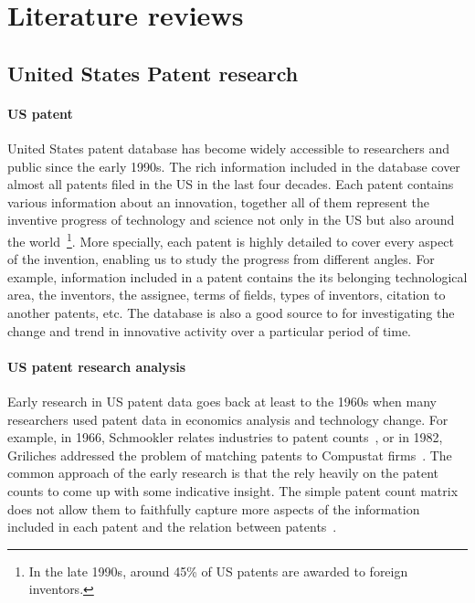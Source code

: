 \section{Literature reviews}

\subsection{United States Patent research}

\paragraph{US patent} United States patent database has become widely accessible to researchers and public since the early 1990s. The rich information included in the database cover almost all patents filed in the US in the last four decades. Each patent contains various information about an innovation, together all of them represent the inventive progress of technology and science not only in the US but also around the world~\footnote{In the late 1990s, around 45\% of US patents are awarded to foreign inventors.}. More specially, each patent is highly detailed to cover every
aspect of the invention, enabling us to study the progress from different angles. For example, information included in a patent contains the its belonging technological area, the inventors, the assignee,  terms of fields, types of inventors, citation to another patents, etc.
The database is also a good source to for investigating the change and trend in innovative activity over a particular period of time. 


\paragraph{US patent research analysis} Early research in US patent data goes
back at least to the 1960s when many researchers used patent data in economics
analysis and technology change. For example, in 1966,  Schmookler relates
industries to patent counts~\cite{Schmookler1966}, or in 1982, Griliches
addressed the problem of matching patents to Compustat
firms~\cite{Griliches1982}. The common approach of the early research is that
the rely heavily on the patent counts to come up with some indicative insight.
The simple patent count matrix does not allow them to faithfully capture more
aspects of the information included in each patent and the relation between
patents~\cite{Griliches1987}.

